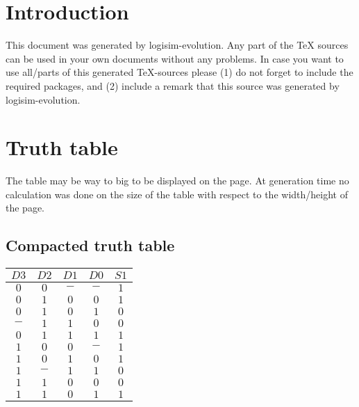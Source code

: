 \documentclass [15pt,a4paper,twoside]{article}
\begin{document}
\section{Introduction}
This document was generated by logisim-evolution. Any part of the TeX sources can be used in your own documents without any problems. In case you want to use all/parts of this generated TeX-sources please (1) do not forget to include the required packages, and (2) include a remark that this source was generated by logisim-evolution.
\section{Truth table}
The table may be way to big to be displayed on the page. At generation time no calculation was done on the size of the table with respect to the width/height of the page.
\subsection{Compacted truth table}
\begin{center}
\begin{tabular}{cccc|c}
$D3$&$D2$&$D1$&$D0$&$S1$\\
\hline
$0$&$0$&$-$&$-$&$1$\\
$0$&$1$&$0$&$0$&$1$\\
$0$&$1$&$0$&$1$&$0$\\
$-$&$1$&$1$&$0$&$0$\\
$0$&$1$&$1$&$1$&$1$\\
$1$&$0$&$0$&$-$&$1$\\
$1$&$0$&$1$&$0$&$1$\\
$1$&$-$&$1$&$1$&$0$\\
$1$&$1$&$0$&$0$&$0$\\
$1$&$1$&$0$&$1$&$1$\\

\end{tabular}
\end{center}
\end{document}
